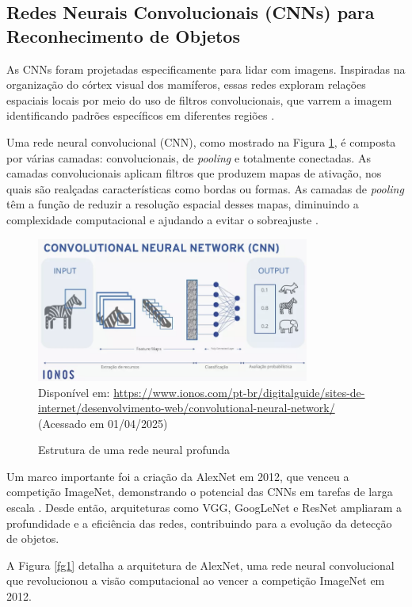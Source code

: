 \subsection{Redes Neurais Convolucionais (CNNs) para Reconhecimento de Objetos}
As CNNs foram projetadas especificamente para lidar com imagens. Inspiradas na organização do córtex visual dos mamíferos, essas redes exploram relações espaciais locais por meio do uso de filtros convolucionais, que varrem a imagem identificando padrões específicos em diferentes regiões \cite{lecun2015}.

Uma rede neural convolucional (CNN), como mostrado na Figura \ref{fg-cnn}, é composta por várias camadas: convolucionais, de \textit{pooling} e totalmente conectadas. As camadas convolucionais aplicam filtros que produzem mapas de ativação, nos quais são realçadas características como bordas ou formas. As camadas de \textit{pooling} têm a função de reduzir a resolução espacial desses mapas, diminuindo a complexidade computacional e ajudando a evitar o sobreajuste \cite{gu2018}.

\begin{figure}[htbp]
  \centering
  \caption{Estrutura de uma rede neural profunda}
  \includegraphics[width=0.8\textwidth]{Figuras/cnn.png}
  \\
  Disponível em: \url{https://www.ionos.com/pt-br/digitalguide/sites-de-internet/desenvolvimento-web/convolutional-neural-network/} (Acessado em 01/04/2025)
  \label{fg-cnn}
\end{figure}

Um marco importante foi a criação da AlexNet em 2012, que venceu a competição ImageNet, demonstrando o potencial das CNNs em tarefas de larga escala \cite{krizhevsky2012}. Desde então, arquiteturas como VGG, GoogLeNet e ResNet ampliaram a profundidade e a eficiência das redes, contribuindo para a evolução da detecção de objetos.

A Figura \ref{fg1} detalha a arquitetura de AlexNet, uma rede neural convolucional que revolucionou a visão computacional ao vencer a competição ImageNet em 2012.


